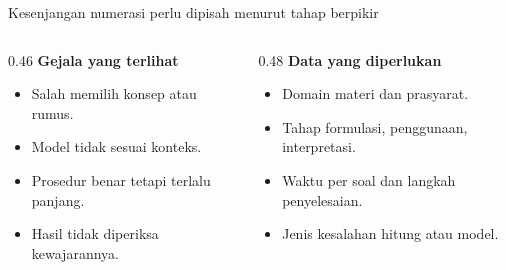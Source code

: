 \begin{frame}{Kesenjangan numerasi perlu dipisah menurut tahap berpikir}
  \begin{columns}[T,onlytextwidth]
    \begin{column}{0.46\textwidth}
      {\color{StudentBlue}\bfseries Gejala yang terlihat}\par
      \begin{itemize}
        \item Salah memilih konsep atau rumus.
        \item Model tidak sesuai konteks.
        \item Prosedur benar tetapi terlalu panjang.
        \item Hasil tidak diperiksa kewajarannya.
      \end{itemize}
    \end{column}
    \begin{column}{0.48\textwidth}
      {\color{StudentBlue}\bfseries Data yang diperlukan}\par
      \begin{itemize}
        \item Domain materi dan prasyarat.
        \item Tahap formulasi, penggunaan, interpretasi.
        \item Waktu per soal dan langkah penyelesaian.
        \item Jenis kesalahan hitung atau model.
      \end{itemize}
    \end{column}
  \end{columns}
  \vspace{0.14cm}
\end{frame}

